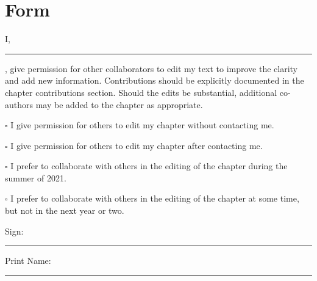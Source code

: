 \documentclass{book}\usepackage{knitr}
\begin{document}
\section*{Form}

I, \rule{3in}{0.4pt}, give permission for other collaborators to edit my text to improve the clarity and add new information. Contributions should be explicitly documented in the chapter contributions section. Should the edits be substantial, additional co-authors may be added to the chapter as appropriate. 

\bigskip

$\square$ I give permission for others to edit my chapter without contacting me.

\medskip

$\square$ I give permission for others to edit my chapter after contacting me.

\medskip

$\square$ I prefer to collaborate with others in the editing of the chapter during the summer of 2021.

\medskip

$\square$ I prefer to collaborate with others in the editing of the chapter at some time, but not in the next year or two.

\bigskip

\noindent Sign: \rule{3.4in}{0.4pt}

\bigskip
\noindent Print Name: \rule{3in}{0.4pt}
\end{document}
